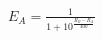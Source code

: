 \documentclass[preview]{standalone}
\begin{document}
\begin{align*}
E_A = \frac{1}{1 + 10^{\frac{R_B - R_A}{400}}}
\end{align*}
\end{document}
